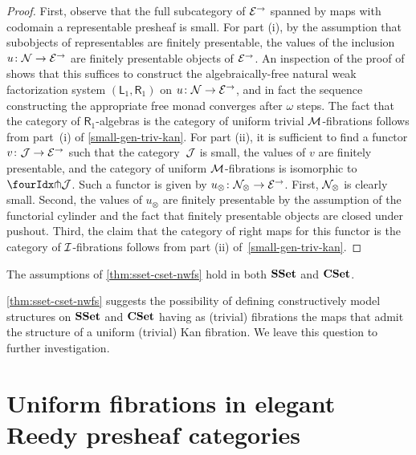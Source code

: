 \documentclass[reqno,10pt,a4paper,oneside,draft]{amsart}
\begin{document}
\begin{proof}
First, observe that the full subcategory of $\catE^\to$ spanned by maps with codomain a representable presheaf is small.
For part (i), by the assumption that subobjects of representables are finitely presentable, the values of the inclusion $u \co \cal{N} \to \cal{E}^\to$ are finitely presentable objects of $\cal{E}^\to$.
An inspection of the proof of \cite[Proposition 4.22]{garner:small-object-argument} shows that this suffices to construct the algebraically-free natural weak factorization system $(\mathsf{L}_1, \mathsf{R}_1)$ on $u \co \cal{N} \to \cal{E}^\to$, and in fact the sequence constructing the appropriate free monad converges after $\omega$ steps.
The fact that the category of $\mathsf{R}_1$-algebras is the category of uniform trivial $\cal{M}$-fibrations follows from part~(i) of \cref{small-gen-triv-kan}.
For part (ii), it is sufficient to find a functor $v \co \cal{J} \rightarrow \catE^\to$ such that the category~$\cal{J}$ is small, the values of $v$ are finitely presentable, and the category of uniform $\cal{M}$-fibrations is isomorphic to~$\liftr{\cal{J}}$.
Such a functor is given by $u_\otimes \co \cal{N}_\otimes \rightarrow \catE^\to$.
First, $\cal{N}_\otimes$ is clearly small.
Second, the values of $u_\otimes$ are finitely presentable by the assumption of the functorial cylinder and the fact that finitely presentable objects are closed under pushout.
Third, the claim that the category of right maps for this functor is the category of $\cal{I}$-fibrations follows from part (ii) of~\cref{small-gen-triv-kan}.
\end{proof}

\begin{example}
The assumptions of \cref{thm:sset-cset-nwfs} hold in both $\SSet$ and $\CSet$.
\end{example}

\cref{thm:sset-cset-nwfs} suggests the possibility of defining constructively model structures on $\SSet$ and $\CSet$ having as (trivial) fibrations the maps that admit the structure of a uniform (trivial) Kan fibration.
We leave this question to further investigation.


\section{Uniform fibrations in elegant Reedy presheaf categories}
\label{sec:non-alg}
\end{document}
